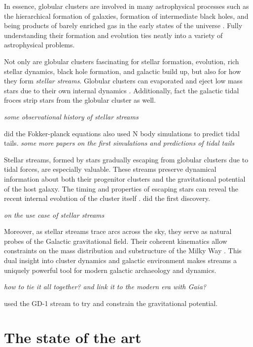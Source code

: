     In essence, globular clusters are involved in many astrophysical processes such as the hierarchical formation of galaxies, formation of intermediate black holes, and being products of barely enriched gas in the early states of the universe \citep{2016ApJ...823...52K,2025arXiv250116438K}. Fully understanding their formation and evolution ties neatly into a variety of astrophysical problems.

    Not only are globular clusters fascinating for stellar formation, evolution, rich stellar dynamics, black hole formation, and galactic build up, but also for how they form \textit{stellar streams}. Globular clusters can evaporated and eject low mass stars due to their own internal dynamics \citep{2003gmbp.book.....H}. Additionally, fact the galactic tidal froces strip stars from the globular cluster as well. \citep{2007ApJ...659.1212M}
    
    \textit{some observational history of stellar streams}

    \citep{1992ApJ...386..519O} did the Fokker-planck equations \citet{1999A&A...352..149C} also used N body simulations to predict tidal tails.  \textit{some more papers on the first simulations and predictions of tidal tails}

    Stellar streams, formed by stars gradually escaping from globular clusters due to tidal forces, are especially valuable. These streams preserve dynamical information about both their progenitor clusters and the gravitational potential of the host galaxy. The timing and properties of escaping stars can reveal the recent internal evolution of the cluster itself \citep{1972ApJ...178..623T}.  \citet{1995AJ....109.2553G} did the first discovery.

    \textit{on the use case of stellar streams }

    Moreover, as stellar streams trace arcs across the sky, they serve as natural probes of the Galactic gravitational field. Their coherent kinematics allow constraints on the mass distribution and substructure of the Milky Way \citep{2011MNRAS.417..198V}. This dual insight into cluster dynamics and galactic environment makes streams a uniquely powerful tool for modern galactic archaeology and dynamics.

    \textit{how to tie it all together? and link it to the modern era with Gaia?}

    \citet{2010ApJ...712..260K} used the GD-1 stream to try and constrain the gravitational potential.

\section{The state of the art}

